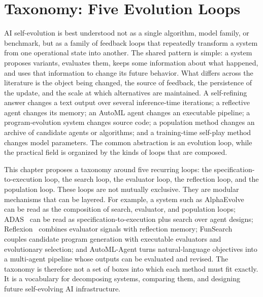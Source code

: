 \section{Taxonomy: Five Evolution Loops}
\label{sec:taxonomy-five-loops}

AI self-evolution is best understood not as a single algorithm, model family, or benchmark, but as a family of feedback loops that repeatedly transform a system from one operational state into another.  The shared pattern is simple: a system proposes variants, evaluates them, keeps some information about what happened, and uses that information to change its future behavior.  What differs across the literature is the object being changed, the source of feedback, the persistence of the update, and the scale at which alternatives are maintained.  A self-refining answer changes a text output over several inference-time iterations; a reflective agent changes its memory; an AutoML agent changes an executable pipeline; a program-evolution system changes source code; a population method changes an archive of candidate agents or algorithms; and a training-time self-play method changes model parameters.  The common abstraction is an evolution loop, while the practical field is organized by the kinds of loops that are composed.

This chapter proposes a taxonomy around five recurring loops: the specification-to-execution loop, the search loop, the evaluator loop, the reflection loop, and the population loop.  These loops are not mutually exclusive.  They are modular mechanisms that can be layered.  For example, a system such as AlphaEvolve~\cite{alphaevolve2025} can be read as the composition of search, evaluator, and population loops; ADAS~\cite{adas2025} can be read as specification-to-execution plus search over agent designs; Reflexion~\cite{reflexion2023} combines evaluator signals with reflection memory; FunSearch~\cite{funsearch2024} couples candidate program generation with executable evaluators and evolutionary selection; and AutoML-Agent turns natural-language objectives into a multi-agent pipeline whose outputs can be evaluated and revised.  The taxonomy is therefore not a set of boxes into which each method must fit exactly.  It is a vocabulary for decomposing systems, comparing them, and designing future self-evolving AI infrastructure.

